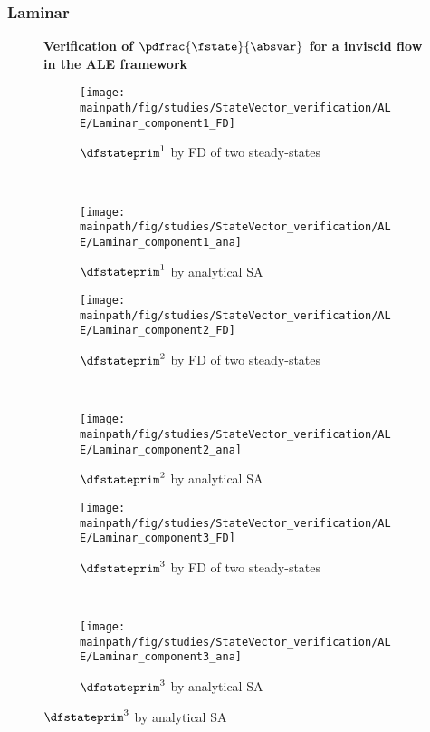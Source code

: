 \documentclass[../main.tex]{subfiles}
\begin{document}
\subsubsection{Laminar}
\begin{figure}[t!]
    \centering

    \textbf{Verification of $\pdfrac{\fstate}{\absvar}$ for a inviscid flow in the ALE framework}\par\medskip    
    
    \begin{subfigure}[t]{0.5\textwidth}
        \centering
        \texttt{[image: \\mainpath/fig/studies/StateVector\_verification/ALE/Laminar\_component1\_FD]}
        \caption{$\dfstateprim^1$ by \ac{FD} of two steady-states}
    \end{subfigure}%
    ~ 
    \begin{subfigure}[t]{0.5\textwidth}
        \centering
        \texttt{[image: \\mainpath/fig/studies/StateVector\_verification/ALE/Laminar\_component1\_ana]}
        \caption{$\dfstateprim^1$ by analytical \ac{SA}}
    \end{subfigure}
    
    
    \begin{subfigure}[t]{0.5\textwidth}
        \centering
        \texttt{[image: \\mainpath/fig/studies/StateVector\_verification/ALE/Laminar\_component2\_FD]}
        \caption{$\dfstateprim^2$ by \ac{FD} of two steady-states}
    \end{subfigure}%
    ~ 
    \begin{subfigure}[t]{0.5\textwidth}
        \centering
        \texttt{[image: \\mainpath/fig/studies/StateVector\_verification/ALE/Laminar\_component2\_ana]}
        \caption{$\dfstateprim^2$ by analytical \ac{SA}}
    \end{subfigure}
    
    
    \begin{subfigure}[t]{0.5\textwidth}
        \centering
        \texttt{[image: \\mainpath/fig/studies/StateVector\_verification/ALE/Laminar\_component3\_FD]}
        \caption{$\dfstateprim^3$ by \ac{FD} of two steady-states}
    \end{subfigure}%
    ~ 
    \begin{subfigure}[t]{0.5\textwidth}
        \centering
        \texttt{[image: \\mainpath/fig/studies/StateVector\_verification/ALE/Laminar\_component3\_ana]}
        \caption{$\dfstateprim^3$ by analytical \ac{SA}}
    \end{subfigure}
    

\end{figure}
\end{document}
